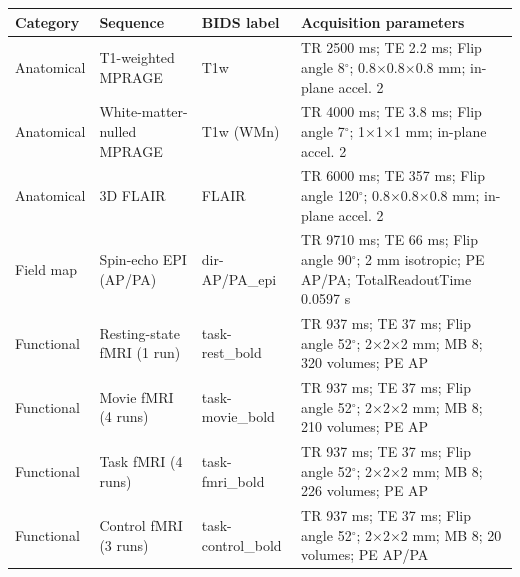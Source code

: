 \documentclass[11pt]{article}
\begin{document}
\pagestyle{empty}
\vspace*{0pt}
\begin{center}
\setlength{\tabcolsep}{4.5pt}
\renewcommand{\arraystretch}{1.28}
\begin{minipage}{0.98\textwidth}
\centering
\begin{tabularx}{\textwidth}{@{}L{2.15cm}L{3.6cm}L{2.7cm}Y@{}}
\toprule
\textcolor{headergray}{\textbf{Category}} &
\textcolor{headergray}{\textbf{Sequence}} &
\textcolor{headergray}{\textbf{BIDS label}} &
\textcolor{headergray}{\textbf{Acquisition parameters}} \\
\midrule
Anatomical & T1-weighted MPRAGE & {\ttfamily\footnotesize T1w} & TR 2500 ms; TE 2.2 ms; Flip angle 8$^{\circ}$; 0.8$\times$0.8$\times$0.8 mm; in-plane accel. 2 \\
 Anatomical & White-matter-nulled MPRAGE & {\ttfamily\footnotesize T1w (WMn)} & TR 4000 ms; TE 3.8 ms; Flip angle 7$^{\circ}$; 1$\times$1$\times$1 mm; in-plane accel. 2 \\
Anatomical & 3D FLAIR & {\ttfamily\footnotesize FLAIR} & TR 6000 ms; TE 357 ms; Flip angle 120$^{\circ}$; 0.8$\times$0.8$\times$0.8 mm; in-plane accel. 2 \\
 Field map & Spin-echo EPI (AP/PA) & {\ttfamily\footnotesize dir-AP/PA\_epi} & TR 9710 ms; TE 66 ms; Flip angle 90$^{\circ}$; 2 mm isotropic; PE AP/PA; TotalReadoutTime 0.0597 s \\
Functional & Resting-state fMRI (1 run) & {\ttfamily\footnotesize task-rest\_bold} & TR 937 ms; TE 37 ms; Flip angle 52$^{\circ}$; 2$\times$2$\times$2 mm; MB 8; 320 volumes; PE AP \\
 Functional & Movie fMRI (4 runs) & {\ttfamily\footnotesize task-movie\_bold} & TR 937 ms; TE 37 ms; Flip angle 52$^{\circ}$; 2$\times$2$\times$2 mm; MB 8; 210 volumes; PE AP \\
Functional & Task fMRI (4 runs) & {\ttfamily\footnotesize task-fmri\_bold} & TR 937 ms; TE 37 ms; Flip angle 52$^{\circ}$; 2$\times$2$\times$2 mm; MB 8; 226 volumes; PE AP \\
 Functional & Control fMRI (3 runs) & {\ttfamily\footnotesize task-control\_bold} & TR 937 ms; TE 37 ms; Flip angle 52$^{\circ}$; 2$\times$2$\times$2 mm; MB 8; 20 volumes; PE AP/PA \\

\end{tabularx}
\end{minipage}
\end{center}
\end{document}
